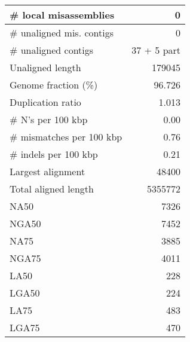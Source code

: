 \documentclass[12pt,a4paper]{article}
\begin{document}
\begin{table}[ht]
\begin{center}
\begin{tabular}{|l*{1}{|r}|}
\# local misassemblies & 0 \\ \hline
\# unaligned mis. contigs & 0 \\ \hline
\# unaligned contigs & 37 + 5 part \\ \hline
Unaligned length & 179045 \\ \hline
Genome fraction (\%) & 96.726 \\ \hline
Duplication ratio & 1.013 \\ \hline
\# N's per 100 kbp & 0.00 \\ \hline
\# mismatches per 100 kbp & 0.76 \\ \hline
\# indels per 100 kbp & 0.21 \\ \hline
Largest alignment & 48400 \\ \hline
Total aligned length & 5355772 \\ \hline
NA50 & 7326 \\ \hline
NGA50 & 7452 \\ \hline
NA75 & 3885 \\ \hline
NGA75 & 4011 \\ \hline
LA50 & 228 \\ \hline
LGA50 & 224 \\ \hline
LA75 & 483 \\ \hline
LGA75 & 470 \\ \hline
\end{tabular}
\end{center}
\end{table}
\end{document}
